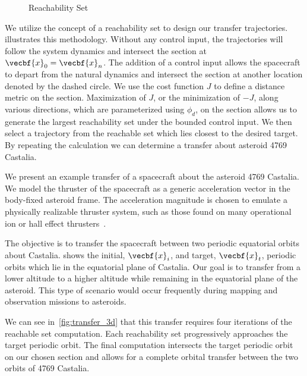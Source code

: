 \documentclass[11pt,reqno]{amsart} %
\begin{document}
\begin{multicols}{2}
\begin{figure}[H]
\begin{scaletikzpicturetowidth}{0.1\columnwidth}
\end{scaletikzpicturetowidth}
\caption{Reachability Set\label{fig:reachability_set}}
\end{figure}
We utilize the concept of a reachability set to design our transfer trajectories.
 illustrates this methodology.
Without any control input, the trajectories will follow the system dynamics and intersect the \Poincare section at \( \vecbf{x}_0 = \vecbf{x}_n\).
The addition of a control input allows the spacecraft to depart from the natural dynamics and intersect the section at another location denoted by the dashed circle.
We use the cost function \( J \) to define a distance metric on the \Poincare section.
Maximization of \( J \), or the minimization of \( -J \), along various directions, which are parameterized using \( \phi_d \), on the \Poincare section allows us to generate the largest reachability set under the bounded control input.
We then select a trajectory from the reachable set which lies closest to the desired target. 
By repeating the calculation we can determine a transfer about asteroid 4769 Castalia.

We present an example transfer of a spacecraft about the asteroid 4769 Castalia.  
We model the thruster of the spacecraft as a generic acceleration vector in the body-fixed asteroid frame. 
The acceleration magnitude is chosen to emulate a physically realizable thruster system, such as those found on many operational ion or hall effect thrusters~\cite{goebel2008,choueiri2009}.

The objective is to transfer the spacecraft between two periodic equatorial orbits about Castalia.
 shows the initial, \( \vecbf{x}_i \), and target, \( \vecbf{x}_t\), periodic orbits which lie in the equatorial plane of Castalia.
Our goal is to transfer from a lower altitude to a higher altitude while remaining in the equatorial plane of the asteroid.
This type of scenario would occur frequently during mapping and observation missions to asteroids.

We can see in~\cref{fig:transfer_3d} that this transfer requires four iterations of the reachable set computation. 
Each reachability set progressively approaches the target periodic orbit.
The final computation intersects the target periodic orbit on our chosen \Poincare section and allows for a complete orbital transfer between the two orbits of 4769 Castalia.




\end{multicols}
\end{document}

